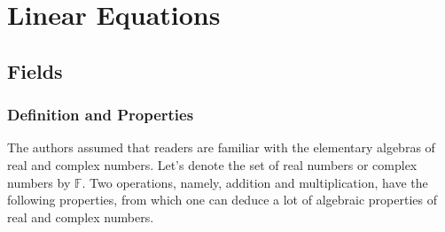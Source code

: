 \chapter{Linear Equations}

\section{Fields}

\subsection{Definition and Properties}

The authors assumed that readers are familiar with the elementary algebras of real and complex numbers. Let's denote the set of real numbers or complex numbers by $\mathbb{F}$. Two operations, namely, addition and multiplication, have the following properties, from which one can deduce a lot of algebraic properties of real and complex numbers.

